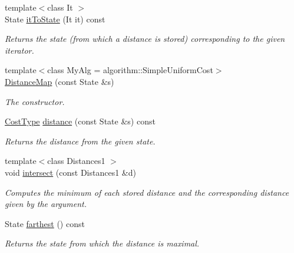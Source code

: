 \begin{DoxyCompactItemize}
{\footnotesize template$<$class It $>$ }\\State \hyperlink{structslb_1_1ext_1_1heuristic_1_1differential_1_1DistanceMap_3_01State_00_01Index_00_01IndexKind_1_1none_01_4_aa4a2bfeeb834d60af896ce17e323c13c}{it\+To\+State} (It it) const 
\begin{DoxyCompactList}\small\item\em Returns the state (from which a distance is stored) corresponding to the given iterator. \end{DoxyCompactList}\item 
{\footnotesize template$<$class My\+Alg  = algorithm\+::\+Simple\+Uniform\+Cost$>$ }\\\hyperlink{structslb_1_1ext_1_1heuristic_1_1differential_1_1DistanceMap_3_01State_00_01Index_00_01IndexKind_1_1none_01_4_a2f24c0038c0063c1efb23558a981bb30}{Distance\+Map} (const State \&s)
\begin{DoxyCompactList}\small\item\em The constructor. \end{DoxyCompactList}\item 
\hyperlink{structslb_1_1ext_1_1heuristic_1_1differential_1_1DistanceMap_3_01State_00_01Index_00_01IndexKind_1_1none_01_4_a7b581d785190b93a68423219d1e39b35}{Cost\+Type} \hyperlink{structslb_1_1ext_1_1heuristic_1_1differential_1_1DistanceMap_3_01State_00_01Index_00_01IndexKind_1_1none_01_4_a7512d3c098d50eeb82974c8c4464683e}{distance} (const State \&s) const 
\begin{DoxyCompactList}\small\item\em Returns the distance from the given state. \end{DoxyCompactList}\item 
{\footnotesize template$<$class Distances1 $>$ }\\void \hyperlink{structslb_1_1ext_1_1heuristic_1_1differential_1_1DistanceMap_3_01State_00_01Index_00_01IndexKind_1_1none_01_4_a6186c3704378a67d22382b0f41f55cb2}{intersect} (const Distances1 \&d)
\begin{DoxyCompactList}\small\item\em Computes the minimum of each stored distance and the corresponding distance given by the argument. \end{DoxyCompactList}\item 
State \hyperlink{structslb_1_1ext_1_1heuristic_1_1differential_1_1DistanceMap_3_01State_00_01Index_00_01IndexKind_1_1none_01_4_a1ef6298a4d0ee2096e4d0b640857a813}{farthest} () const 
\begin{DoxyCompactList}\small\item\em Returns the state from which the distance is maximal. \end{DoxyCompactList}\item 

\end{DoxyCompactItemize}
